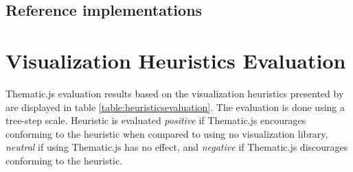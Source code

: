 \section{Reference implementations}


\chapter{Visualization Heuristics Evaluation}
\label{appendix:heuristicsevaluation}

Thematic.js evaluation results based on the visualization heuristics presented by \citet{zuk_heuristics_2006} are displayed in table \ref{table:heuristicsevaluation}. The evaluation is done using a tree-step scale. Heuristic is evaluated \emph{positive} if Thematic.js encourages conforming to the heuristic when compared to using no visualization library, \emph{neutral} if using Thematic.js has no effect, and \emph{negative} if Thematic.js discourages conforming to the heuristic.

